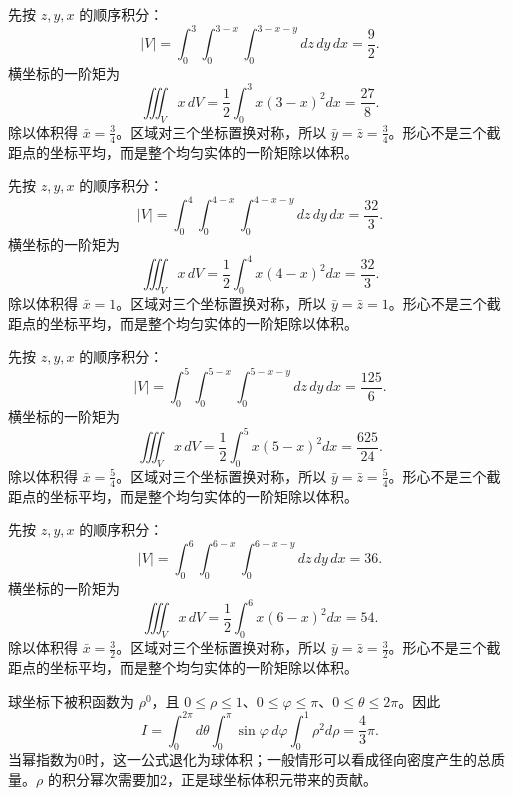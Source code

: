 \documentclass[UTF8,12pt,a4paper,fontset=fandol]{ctexart}
\begin{document}
\begin{solve}\label{ans:c38q9}
先按 $z,y,x$ 的顺序积分：
\[
|V|=\int_0^{3}\int_0^{3-x}\int_0^{3-x-y}dz\,dy\,dx=\frac{9}{2}.
\]
横坐标的一阶矩为
\[
\iiint_Vx\,dV=\frac12\int_0^{3}x(3-x)^2dx=\frac{27}{8}.
\]
除以体积得 $\bar x=\frac{3}{4}$。区域对三个坐标置换对称，所以 $\bar y=\bar z=\frac{3}{4}$。形心不是三个截距点的坐标平均，而是整个均匀实体的一阶矩除以体积。
\end{solve}

\begin{solve}\label{ans:c38q10}
先按 $z,y,x$ 的顺序积分：
\[
|V|=\int_0^{4}\int_0^{4-x}\int_0^{4-x-y}dz\,dy\,dx=\frac{32}{3}.
\]
横坐标的一阶矩为
\[
\iiint_Vx\,dV=\frac12\int_0^{4}x(4-x)^2dx=\frac{32}{3}.
\]
除以体积得 $\bar x=1$。区域对三个坐标置换对称，所以 $\bar y=\bar z=1$。形心不是三个截距点的坐标平均，而是整个均匀实体的一阶矩除以体积。
\end{solve}

\begin{solve}\label{ans:c38q11}
先按 $z,y,x$ 的顺序积分：
\[
|V|=\int_0^{5}\int_0^{5-x}\int_0^{5-x-y}dz\,dy\,dx=\frac{125}{6}.
\]
横坐标的一阶矩为
\[
\iiint_Vx\,dV=\frac12\int_0^{5}x(5-x)^2dx=\frac{625}{24}.
\]
除以体积得 $\bar x=\frac{5}{4}$。区域对三个坐标置换对称，所以 $\bar y=\bar z=\frac{5}{4}$。形心不是三个截距点的坐标平均，而是整个均匀实体的一阶矩除以体积。
\end{solve}

\begin{solve}\label{ans:c38q12}
先按 $z,y,x$ 的顺序积分：
\[
|V|=\int_0^{6}\int_0^{6-x}\int_0^{6-x-y}dz\,dy\,dx=36.
\]
横坐标的一阶矩为
\[
\iiint_Vx\,dV=\frac12\int_0^{6}x(6-x)^2dx=54.
\]
除以体积得 $\bar x=\frac{3}{2}$。区域对三个坐标置换对称，所以 $\bar y=\bar z=\frac{3}{2}$。形心不是三个截距点的坐标平均，而是整个均匀实体的一阶矩除以体积。
\end{solve}

\begin{solve}\label{ans:c38q13}
球坐标下被积函数为 $\rho^{0}$，且 $0\le\rho\le 1$、$0\le\varphi\le\pi$、$0\le\theta\le2\pi$。因此
\[
I=\int_0^{2\pi}d\theta\int_0^\pi\sin\varphi\,d\varphi\int_0^{1}\rho^{2}d\rho=\frac{4}{3}\pi.
\]
当幂指数为0时，这一公式退化为球体积；一般情形可以看成径向密度产生的总质量。$\rho$ 的积分幂次需要加2，正是球坐标体积元带来的贡献。
\end{solve}
\end{document}
